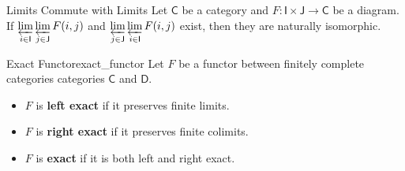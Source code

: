 \begin{proposition}{Limits Commute with Limits}{}
    Let $\mathsf{C}$ be a category and $F:\mathsf{I}\times \mathsf{J}\to\mathsf{C}$ be a diagram. If $\varprojlim\limits_{i\in \mathsf{I}}\varprojlim\limits_{j\in \mathsf{J}}F(i,j)$ and $\varprojlim\limits_{j\in \mathsf{J}}\varprojlim\limits_{i\in \mathsf{I}}F(i,j)$ exist, then they are naturally isomorphic.
\end{proposition}


\begin{definition}{Exact Functor}{exact_functor}
    Let $F$ be a functor between finitely complete categories categories $\mathsf{C}$ and $\mathsf{D}$.
    \begin{itemize}
        \item $F$ is \textbf{left exact} if it preserves finite limits.
        \item $F$ is \textbf{right exact} if it preserves finite colimits.
        \item $F$ is \textbf{exact} if it is both left and right exact.
    \end{itemize}
\end{definition}


